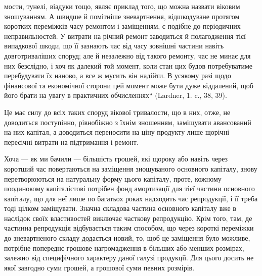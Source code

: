 \parcont{}  %
мости, тунелі, віадуки тощо, являє приклад того, що можна назвати
віковим зношуванням. А швидше й помітніше зневартнення, відшкодуване
протягом коротких переміжків часу ремонтом і заміщенням, є подібне
до періодичних неправильностей. У витрати на річний ремонт заводиться
й полагодження тієї випадкової шкоди, що її зазнають час від часу
зовнішні частини навіть довготриваліших споруд; але й незалежно від
такого ремонту, час не минає для них безслідно, і хоч як далекий той момент,
коли стан цих будов потребуватиме перебудувати їх наново, а все ж
мусить він надійти. В усякому разі щодо фінансової та економічної сторони
цей момент може бути дуже віддалений, щоб його брати на увагу
в практичних обчисленнях“ (Lardner, 1. c., 38, 39).

Це має силу до всіх таких споруд вікової тривалости, що в них,
отже, не доводиться поступінно, рівнобіжно з їхнім зношенням, заміщувати
авансований на них капітал, а доводиться переносити на ціну продукту
лише щорічні пересічні витрати на підтримання і ремонт.

Хоча — як ми бачили — більшість грошей, які щороку або навіть
через коротший час повертаються на заміщення зношуваного основного
капіталу, знову перетворюються на натуральну форму цього капіталу,
проте, кожному поодинокому капіталістові потрібен фонд амортизації для тієї
частини основного капіталу, що для неї лише по багатьох роках надходить час
репродукції, і її треба тоді цілком заміщувати. Значна складова частина основного
капіталу вже в наслідок своїх властивостей виключає часткову репродукцію.
Крім того, там, де частинна репродукція відбувається таким способом, що
через короткі переміжки до зневартненого складу додається новий, то, щоб це
заміщення було можливе, потрібне попереднє грошове нагромадження
в більших або менших розмірах, залежно від специфічного характеру
даної галузі продукції. Для цього досить не якої завгодно суми грошей,
а грошової суми певних розмірів.

